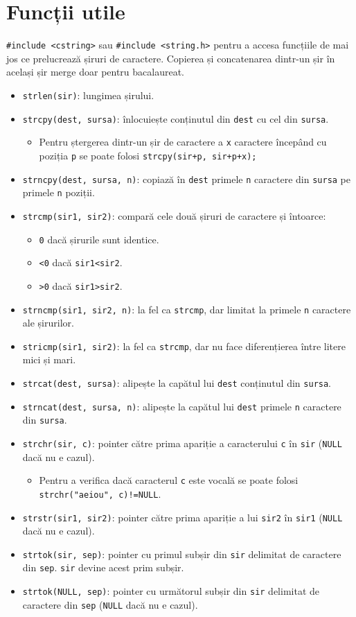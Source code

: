 \documentclass{article}
\begin{document}
\section*{Funcții utile}
\verb|#include <cstring>| sau \verb|#include <string.h>| pentru a accesa funcțiile de mai jos ce prelucrează șiruri de caractere. Copierea și concatenarea dintr-un șir în același șir merge doar pentru bacalaureat.
\begin{itemize}
    \item \verb|strlen(sir)|: lungimea șirului.
    \item \verb|strcpy(dest, sursa)|: înlocuiește conținutul din \verb|dest| cu cel din \verb|sursa|.
    \begin{itemize}
        \item Pentru ștergerea dintr-un șir de caractere a \verb|x| caractere începând cu poziția \verb|p| se poate folosi \verb|strcpy(sir+p, sir+p+x);|
    \end{itemize}
    \item \verb|strncpy(dest, sursa, n)|: copiază în \verb|dest| primele \verb|n| caractere din \verb|sursa| pe primele \verb|n| poziții.
    \item \verb|strcmp(sir1, sir2)|: compară cele două șiruri de caractere și întoarce:
    \begin{itemize}
        \item \verb|0| dacă șirurile sunt identice.
        \item \verb|<0| dacă \verb|sir1<sir2|.
        \item \verb|>0| dacă \verb|sir1>sir2|.
    \end{itemize}
    \item \verb|strncmp(sir1, sir2, n)|: la fel ca \verb|strcmp|, dar limitat la primele \verb|n| caractere ale șirurilor.
    \item \verb|stricmp(sir1, sir2)|: la fel ca \verb|strcmp|, dar nu face diferențierea între litere mici și mari.
    \item \verb|strcat(dest, sursa)|: alipește la capătul lui \verb|dest| conținutul din \verb|sursa|.
    \item \verb|strncat(dest, sursa, n)|: alipește la capătul lui \verb|dest| primele \verb|n| caractere din \verb|sursa|.
    \item \verb|strchr(sir, c)|: pointer către prima apariție a caracterului \verb|c| în \verb|sir| (\verb|NULL| dacă nu e cazul).
    \begin{itemize}
        \item Pentru a verifica dacă caracterul \verb|c| este vocală se poate folosi \verb|strchr("aeiou", c)!=NULL|.
    \end{itemize}
    \item \verb|strstr(sir1, sir2)|: pointer către prima apariție a lui \verb|sir2| în \verb|sir1| (\verb|NULL| dacă nu e cazul).
    \item \verb|strtok(sir, sep)|: pointer cu primul subșir din \verb|sir| delimitat de caractere din \verb|sep|. \verb|sir| devine acest prim subșir.
    \item \verb|strtok(NULL, sep)|: pointer cu următorul subșir din \verb|sir| delimitat de caractere din \verb|sep| (\verb|NULL| dacă nu e cazul).
\end{itemize}
\end{document}
